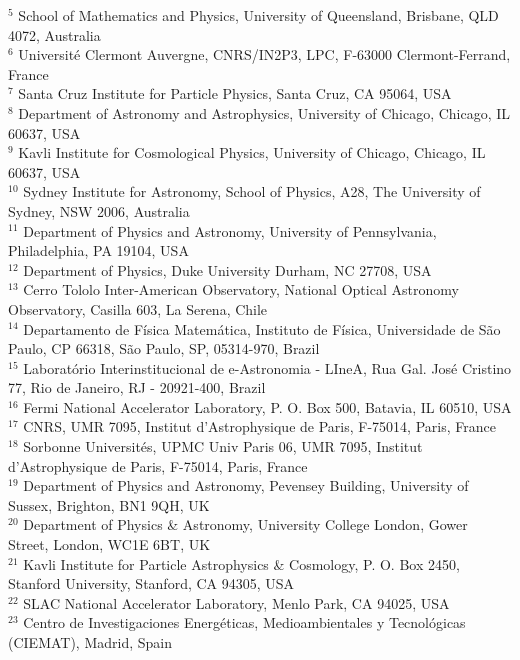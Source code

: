 {{$^{5}$ School of Mathematics and Physics, University of Queensland,  Brisbane, QLD 4072, Australia\\
$^{6}$ Universit\'e Clermont Auvergne, CNRS/IN2P3, LPC, F-63000 Clermont-Ferrand, France\\
$^{7}$ Santa Cruz Institute for Particle Physics, Santa Cruz, CA 95064, USA\\
$^{8}$ Department of Astronomy and Astrophysics, University of Chicago, Chicago, IL 60637, USA\\
$^{9}$ Kavli Institute for Cosmological Physics, University of Chicago, Chicago, IL 60637, USA\\
$^{10}$ Sydney Institute for Astronomy, School of Physics, A28, The University of Sydney, NSW 2006, Australia\\
$^{11}$ Department of Physics and Astronomy, University of Pennsylvania, Philadelphia, PA 19104, USA\\
$^{12}$ Department of Physics, Duke University Durham, NC 27708, USA\\
$^{13}$ Cerro Tololo Inter-American Observatory, National Optical Astronomy Observatory, Casilla 603, La Serena, Chile\\
$^{14}$ Departamento de F\'isica Matem\'atica, Instituto de F\'isica, Universidade de S\~ao Paulo, CP 66318, S\~ao Paulo, SP, 05314-970, Brazil\\
$^{15}$ Laborat\'orio Interinstitucional de e-Astronomia - LIneA, Rua Gal. Jos\'e Cristino 77, Rio de Janeiro, RJ - 20921-400, Brazil\\
$^{16}$ Fermi National Accelerator Laboratory, P. O. Box 500, Batavia, IL 60510, USA\\
$^{17}$ CNRS, UMR 7095, Institut d'Astrophysique de Paris, F-75014, Paris, France\\
$^{18}$ Sorbonne Universit\'es, UPMC Univ Paris 06, UMR 7095, Institut d'Astrophysique de Paris, F-75014, Paris, France\\
$^{19}$ Department of Physics and Astronomy, Pevensey Building, University of Sussex, Brighton, BN1 9QH, UK\\
$^{20}$ Department of Physics \& Astronomy, University College London, Gower Street, London, WC1E 6BT, UK\\
$^{21}$ Kavli Institute for Particle Astrophysics \& Cosmology, P. O. Box 2450, Stanford University, Stanford, CA 94305, USA\\
$^{22}$ SLAC National Accelerator Laboratory, Menlo Park, CA 94025, USA\\
$^{23}$ Centro de Investigaciones Energ\'eticas, Medioambientales y Tecnol\'ogicas (CIEMAT), Madrid, Spain\\
}}
